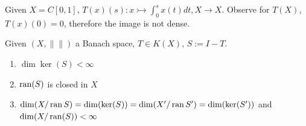 \begin{example}
Given $X = C[0, 1]$, $T(x)(s): x \rightarrowtail \int_0^s x(t)dt, X \rightarrow X$. Observe for $T(X)$, $T(x)(0) = 0$, therefore the image is not dense.
\end{example}

\begin{theorem}\quad
Given $(X, \|\|)$ a Banach space, $T \in K(X)$, $S:= I - T$.
\begin{enumerate}
	\item $\dim\ker(S) < \infty$ 
	\item $\operatorname{ran}(S)$ is closed in $X$ 
	\item $\dim(X\slash \operatorname{ran} S) = \dim(\ker(S)) = \dim(X'\slash \operatorname{ran} S') = \dim(\ker(S'))$ and $\dim(X\slash \operatorname{ran}(S))< \infty$
\end{enumerate}
\end{theorem}
